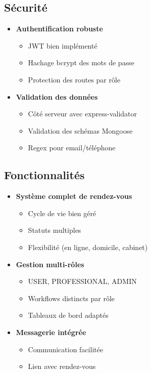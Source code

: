 \documentclass[12pt,a4paper]{article}
\begin{document}
\subsection{Sécurité}

\begin{itemize}
    \item[\checkmark] \textbf{Authentification robuste}
        \begin{itemize}
            \item JWT bien implémenté
            \item Hachage bcrypt des mots de passe
            \item Protection des routes par rôle
        \end{itemize}
    \item[\checkmark] \textbf{Validation des données}
        \begin{itemize}
            \item Côté serveur avec express-validator
            \item Validation des schémas Mongoose
            \item Regex pour email/téléphone
        \end{itemize}
\end{itemize}

\subsection{Fonctionnalités}

\begin{itemize}
    \item[\checkmark] \textbf{Système complet de rendez-vous}
        \begin{itemize}
            \item Cycle de vie bien géré
            \item Statuts multiples
            \item Flexibilité (en ligne, domicile, cabinet)
        \end{itemize}
    \item[\checkmark] \textbf{Gestion multi-rôles}
        \begin{itemize}
            \item USER, PROFESSIONAL, ADMIN
            \item Workflows distincts par rôle
            \item Tableaux de bord adaptés
        \end{itemize}
    \item[\checkmark] \textbf{Messagerie intégrée}
        \begin{itemize}
            \item Communication facilitée
            \item Lien avec rendez-vous
        \end{itemize}
\end{itemize}
\end{document}
